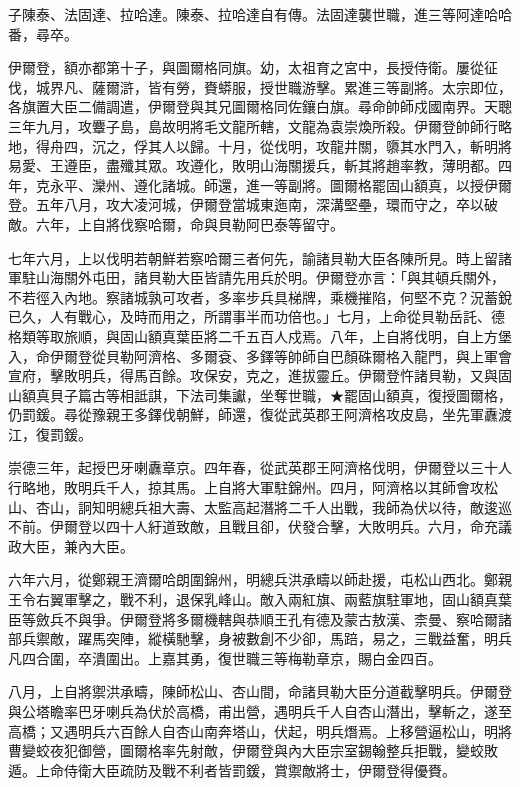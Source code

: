 \begin{pinyinscope}
子陳泰、法固達、拉哈達。陳泰、拉哈達自有傳。法固達襲世職，進三等阿達哈哈番，尋卒。

伊爾登，額亦都第十子，與圖爾格同旗。幼，太祖育之宮中，長授侍衛。屢從征伐，城界凡、薩爾滸，皆有勞，賚蟒服，授世職游擊。累進三等副將。太宗即位，各旗置大臣二備調遣，伊爾登與其兄圖爾格同佐鑲白旗。尋命帥師戍國南界。天聰三年九月，攻麞子島，島故明將毛文龍所轄，文龍為袁崇煥所殺。伊爾登帥師行略地，得舟四，沉之，俘其人以歸。十月，從伐明，攻龍井關，隳其水門入，斬明將易愛、王遵臣，盡殲其眾。攻遵化，敗明山海關援兵，斬其將趙率教，薄明都。四年，克永平、灤州、遵化諸城。師還，進一等副將。圖爾格罷固山額真，以授伊爾登。五年八月，攻大凌河城，伊爾登當城東迤南，深溝堅壘，環而守之，卒以破敵。六年，上自將伐察哈爾，命與貝勒阿巴泰等留守。

七年六月，上以伐明若朝鮮若察哈爾三者何先，諭諸貝勒大臣各陳所見。時上留諸軍駐山海關外屯田，諸貝勒大臣皆請先用兵於明。伊爾登亦言：「與其頓兵關外，不若徑入內地。察諸城孰可攻者，多率步兵具梯牌，乘機摧陷，何堅不克？況蓄銳已久，人有戰心，及時而用之，所謂事半而功倍也。」七月，上命從貝勒岳託、德格類等取旅順，與固山額真葉臣將二千五百人戍焉。八年，上自將伐明，自上方堡入，命伊爾登從貝勒阿濟格、多爾袞、多鐸等帥師自巴顏硃爾格入龍門，與上軍會宣府，擊敗明兵，得馬百餘。攻保安，克之，進拔靈丘。伊爾登忤諸貝勒，又與固山額真貝子篇古等相詆諆，下法司集讞，坐奪世職，★罷固山額真，復授圖爾格，仍罰鍰。尋從豫親王多鐸伐朝鮮，師還，復從武英郡王阿濟格攻皮島，坐先軍纛渡江，復罰鍰。

崇德三年，起授巴牙喇纛章京。四年春，從武英郡王阿濟格伐明，伊爾登以三十人行略地，敗明兵千人，掠其馬。上自將大軍駐錦州。四月，阿濟格以其師會攻松山、杏山，詗知明總兵祖大壽、太監高起潛將二千人出戰，我師為伏以待，敵逡巡不前。伊爾登以四十人紆道致敵，且戰且卻，伏發合擊，大敗明兵。六月，命充議政大臣，兼內大臣。

六年六月，從鄭親王濟爾哈朗圍錦州，明總兵洪承疇以師赴援，屯松山西北。鄭親王令右翼軍擊之，戰不利，退保乳峰山。敵入兩紅旗、兩藍旗駐軍地，固山額真葉臣等斂兵不與爭。伊爾登將多爾機轄與恭順王孔有德及蒙古敖漢、柰曼、察哈爾諸部兵禦敵，躍馬突陣，縱橫馳擊，身被數創不少卻，馬踣，易之，三戰益奮，明兵凡四合圍，卒潰圍出。上嘉其勇，復世職三等梅勒章京，賜白金四百。

八月，上自將禦洪承疇，陳師松山、杏山間，命諸貝勒大臣分道截擊明兵。伊爾登與公塔瞻率巴牙喇兵為伏於高橋，甫出營，遇明兵千人自杏山潛出，擊斬之，遂至高橋；又遇明兵六百餘人自杏山南奔塔山，伏起，明兵熸焉。上移營逼松山，明將曹變蛟夜犯御營，圖爾格率先射敵，伊爾登與內大臣宗室錫翰整兵拒戰，變蛟敗遁。上命侍衛大臣疏防及戰不利者皆罰鍰，賞禦敵將士，伊爾登得優賚。


\end{pinyinscope}
